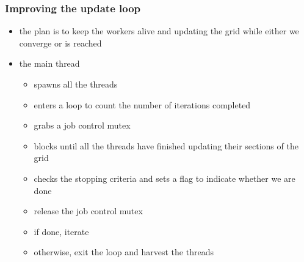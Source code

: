 \begin{frame}[fragile]
%
  \frametitle{Improving the update loop}
%
  \begin{itemize}
%
  \item the plan is to keep the workers alive and updating the grid while either we converge or
     is reached
  \item the main thread
    \begin{itemize}
    \item spawns all the threads
    \item enters a loop to count the number of iterations completed
    \item grabs a job control mutex
    \item blocks until all the threads have finished updating their sections of the grid
    \item checks the stopping criteria and sets a flag to indicate whether we are done
    \item release the job control mutex 
    \item if done, iterate
    \item otherwise, exit the loop and harvest the threads
    \end{itemize}
%
  \end{itemize}
%
\end{frame}


